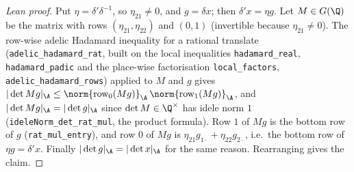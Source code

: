 \begin{proof}[Lean proof]
Put $\eta=\delta'\delta^{-1}$, so $\eta_{21}\ne0$, and $g=\delta x$; then $\delta'x=\eta g$. Let $M\in G(\Q)$ be the matrix with rows $(\eta_{21},\eta_{22})$ and $(0,1)$ (invertible because $\eta_{21}\neq0$). The row-wise adelic Hadamard inequality for a rational translate (\texttt{adelic\_hadamard\_rat}, built on the local inequalities \texttt{hadamard\_real}, \texttt{hadamard\_padic} and the place-wise factorisation \texttt{local\_factors}, \texttt{adelic\_hadamard\_rows}) applied to $M$ and $g$ gives $|\det Mg|_\A\le\norm{\text{row}_0(Mg)}_\A\,\norm{\text{row}_1(Mg)}_\A$, and $|\det Mg|_\A=|\det g|_\A$ since $\det M\in\Q^\times$ has idele norm $1$ (\texttt{ideleNorm\_det\_rat\_mul}, the product formula). Row $1$ of $Mg$ is the bottom row of $g$ (\texttt{rat\_mul\_entry}), and row $0$ of $Mg$ is $\eta_{21}g_{1\cdot}+\eta_{22}g_{2\cdot}$, i.e.\ the bottom row of $\eta g=\delta'x$. Finally $|\det g|_\A=|\det x|_\A$ for the same reason. Rearranging gives the claim.
\end{proof}

